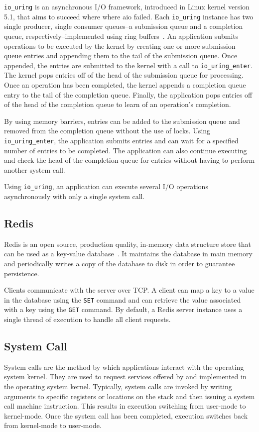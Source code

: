 \documentclass[sigconf]{acmart}
\newcommand{\inlinecode}[1]{\texttt{#1}}
\begin{document}
\inlinecode{io\_uring} is an asynchronous I/O framework, introduced in Linux kernel version 5.1, that aims to succeed where where aio failed.
Each \inlinecode{io\_uring} instance has two single producer, single consumer queues--a submission queue and a completion queue, respectively--implemented using ring buffers~\cite{iouring}.
An application submits operations to be executed by the kernel by creating one or more submission queue entries and appending them to the tail of the submission queue.
Once appended, the entries are submitted to the kernel with a call to \inlinecode{io\_uring\_enter}.
The kernel pops entries off of the head of the submission queue for processing.
Once an operation has been completed, the kernel appends a completion queue entry to the tail of the completion queue.
Finally, the application pops entries off of the head of the completion queue to learn of an operation's completion.

By using memory barriers, entries can be added to the submission queue and removed from the completion queue without the use of locks.
Using \inlinecode{io\_uring\_enter}, the application submits entries and can wait for a specified number of entries to be completed.
The application can also continue executing and check the head of the completion queue for entries without having to perform another system call.

Using \inlinecode{io\_uring}, an application can execute several I/O operations asynchronously with only a single system call.


\subsection{Redis}
Redis is an open source, production quality, in-memory data structure store that can be used as a key-value database~\cite{redis-intro}.
It maintains the database in main memory and periodically writes a copy of the database to disk in order to guarantee persistence.

Clients communicate with the server over TCP.
A client can map a key to a value in the database using the \inlinecode{SET} command and can retrieve the value associated with a key using the \inlinecode{GET} command.
By default, a Redis server instance uses a single thread of execution to handle all client requests.

\subsection{System Call}
System calls are the method by which applications interact with the operating system kernel.
They are used to request services offered by and implemented in the operating system kernel.
Typically, system calls are invoked by writing arguments to specific registers or locations on the stack and then issuing a system call machine instruction.
This results in execution switching from user-mode to kernel-mode.
Once the system call has been completed, execution switches back from kernel-mode to user-mode.
\end{document}
